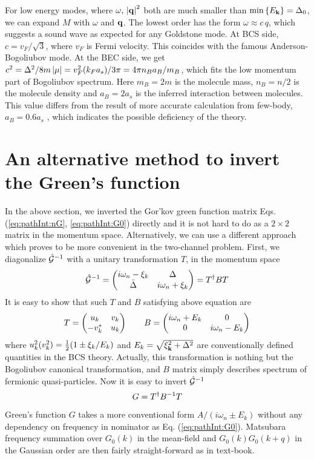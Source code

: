For low energy modes, where $\omega,\,\left\lvert{\ensuremath{\mathbf{q}}}\right\rvert^{2}$ both are much smaller than $\min\left\{E_{\mathbf{k}}\right\}=\Delta_{0}$, we can expand $M$ with $\omega$ and $\mathbf{q}$.  The lowest order has the form $\omega\approx{}c\,q$, which suggests a sound wave as expected for any Goldstone mode.  At BCS side, $c=v_{F}/\sqrt{3}$, where $v_{F}$ is Fermi velocity.  This coincides with the famous Anderson-Bogoliubov mode.  At the BEC side, we get $c^{2}=\Delta^{2}/8m\left\lvert{\mu}\right\rvert=v_{F}^{2}(k_{F}a_{s})/3\pi=4\pi{}n_{B}a_{B}/m_{B}$, which fits the low momentum part of Bogoliubov spectrum.  Here $m_{B}=2m$ is the molecule mass, $n_{B}=n/2$ is the molecule density and $a_{B}=2a_{s}$ is the inferred  interaction between molecules.  This value differs from the result of more accurate calculation from few-body, $a_{B}=0.6a_{s}$ \cite{Petrov}, which indicates the possible deficiency of the theory. 


\section{An alternative method to invert the Green's function\label{sec:diagonalizeGreen1}}
In the above section, we inverted the  Gor'kov green function matrix Eqs. (\ref{eq:pathInt:nG}, \ref{eq:pathInt:G0}) directly and it is not hard to do as a $2\times2$ matrix in the  momentum space.   Alternatively, we can use a different approach which proves to be more convenient in the two-channel problem.  First, we diagonalize $\hat{\mathcal{G}}^{-1}$ with a unitary transformation $T$, in the momentum space
\begin{equation}
\hat{\mathcal{G}}^{-1}=\begin{pmatrix}i\omega_{n}-\xi_{k}&\Delta\\\bar\Delta&i\omega_{n}+\xi_{k}\end{pmatrix}=T^{\dagger}BT
\end{equation}
It is easy to show that such $T$ and $B$ satisfying above equation are
\begin{equation}
T=\begin{pmatrix}u_{k}&v_{k}\\-v_{k}^{*}&u_{k}\end{pmatrix}\qquad{}B=\begin{pmatrix}i\omega_{n}+E_{k}&0\\0&i\omega_{n}-E_{k}\end{pmatrix}
\end{equation}
where $u_{k}^{2}(v_{k}^{2})=\frac{1}{2}(1\pm\xi_{k}/E_{k})$ and $E_{k}=\sqrt{\xi^{2}_{\mathbf{k}}+\Delta^{2}}$ are conventionally defined quantities in the BCS theory.   Actually, this transformation is nothing but the Bogoliubov canonical transformation, and $B$ matrix simply describes spectrum of fermionic quasi-particles.  Now it is easy to invert $\hat{\mathcal{G}}^{-1}$
\begin{equation}
G=T^{\dagger}B^{-1}T
\end{equation}
Green's function $G$ takes a more conventional form $A/(i\omega_{n}\pm{}E_{k})$ without any dependency on frequency in nominator as Eq. (\ref{eq:pathInt:G0}). Matsubara frequency summation over $G_{0}(k)$ in the mean-field and $G_{0}(k)G_{0}(k+q)$ in the Gaussian order are then fairly straight-forward as in text-book.  
